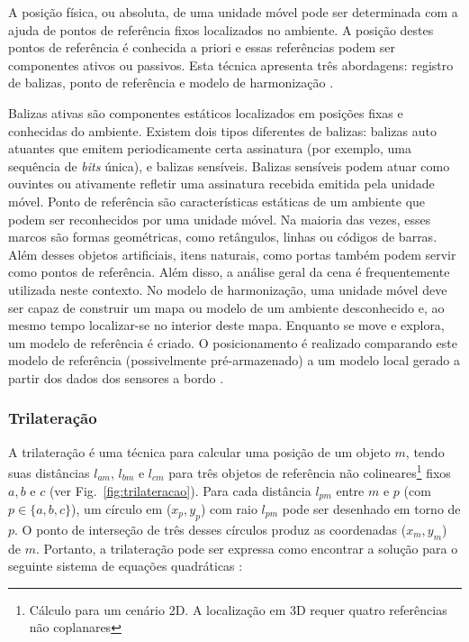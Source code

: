 A posição física, ou absoluta, de uma unidade móvel pode ser determinada com a ajuda de pontos de referência fixos localizados no ambiente. A posição destes pontos de referência é conhecida a priori e essas referências podem ser componentes ativos ou passivos. Esta técnica apresenta três abordagens: registro de balizas, ponto de referência e modelo de harmonização \cite{linde2006aspects}.

Balizas ativas são componentes estáticos localizados em posições fixas e conhecidas do ambiente. Existem dois tipos diferentes de balizas: balizas auto atuantes que emitem periodicamente certa assinatura (por exemplo, uma sequência de \textit{bits} única), e balizas sensíveis. Balizas sensíveis podem atuar como ouvintes ou ativamente refletir uma assinatura recebida emitida pela unidade móvel. Ponto de referência são características estáticas de um ambiente que podem ser reconhecidos por uma unidade móvel. Na maioria das vezes, esses marcos são formas geométricas, como retângulos, linhas ou códigos de barras. Além desses objetos artificiais, itens naturais, como portas também podem servir como pontos de referência. Além disso, a análise geral da cena é frequentemente utilizada neste contexto. No modelo de harmonização, uma unidade móvel deve ser capaz de construir um mapa ou modelo de um ambiente desconhecido e, ao mesmo tempo localizar-se no interior deste mapa. Enquanto se move e explora, um modelo de referência é criado. O posicionamento é realizado comparando este modelo de referência (possivelmente pré-armazenado) a um modelo local gerado a partir dos dados dos sensores a bordo \cite{linde2006aspects}.

\subsubsection{Trilateração}\label{sec:trilat}
A trilateração é uma técnica para calcular uma posição de um objeto $m$, tendo suas distâncias $l_{am}$, $l_{bm}$ e $l_{cm}$ para três objetos de referência não colineares\footnote{ Cálculo para um cenário 2D. A localização em 3D requer quatro referências não coplanares} fixos $a, b$ e $c$ (ver Fig.~\ref{fig:trilateracao}). Para cada distância $l_{pm}$ entre $m$ e $p$ (com $p \in \{a, b, c\}$), um círculo em ($x_{p}, y_{p}$) com raio $l_{pm}$ pode ser desenhado em torno de $p$. O ponto de interseção de três desses círculos produz as coordenadas ($x_{m}, y_{m}$) de $m$. Portanto, a trilateração pode ser expressa como encontrar a solução para o seguinte sistema de equações quadráticas \cite{linde2006aspects}:

